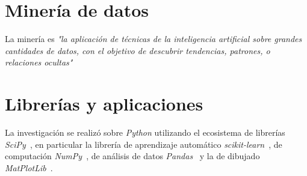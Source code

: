 
\section{Minería de datos}

La minería es \textit{"la aplicación de técnicas de la inteligencia artificial sobre
grandes cantidades de datos, con el objetivo de descubrir
tendencias, patrones, o relaciones ocultas"}\cite{ubu:mineria1}

\section{Librerías y aplicaciones}
La investigación se realizó sobre \textit{Python} utilizando el ecosistema de librerías \textit{SciPy}~\cite{tool:scipy}, en particular la librería de aprendizaje automático \textit{scikit-learn}~\cite{tool:scikit-learn}, de computación \textit{NumPy}~\cite{tool:numpy}, de análisis de datos \textit{Pandas}~\cite{tool:pandas} y la de dibujado \textit{MatPlotLib}~\cite{tool:matplotlib}.


